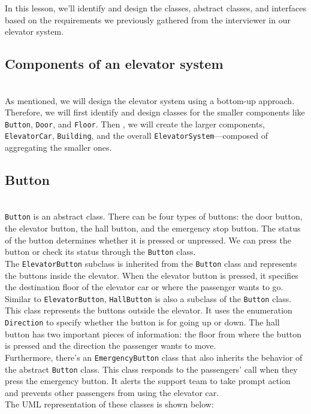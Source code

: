 

In this lesson, we'll identify and design the classes, abstract classes, and interfaces based on the requirements we previously gathered from the interviewer in our elevator system.

\subsection{Components of an elevator system}\label{7gQWTbVCc0ltN6xEKqjYE}
\\
As mentioned, we will design the elevator system using a bottom-up approach. Therefore, we will first identify and design classes for the smaller components like \texttt{Button}, \texttt{Door}, and \texttt{Floor}. Then , we will create the larger components, \texttt{ElevatorCar}, \texttt{Building}, and the overall \texttt{ElevatorSystem}---composed of aggregating the smaller ones.

\subsection{Button}\label{R94f6CUxLI2G4F-24LSWE}
\\
\texttt{Button} is an abstract class. There can be four types of buttons: the door button, the elevator button, the hall button, and the emergency stop button. The status of the button determines whether it is pressed or unpressed. We can press the button or check its status through the \texttt{Button} class.
\\
The \texttt{ElevatorButton} subclass is inherited from the \texttt{Button} class and represents the buttons inside the elevator. When the elevator button is pressed, it specifies the destination floor of the elevator car or where the passenger wants to go.
\\
Similar to \texttt{ElevatorButton}, \texttt{HallButton} is also a subclass of the \texttt{Button} class. This class represents the buttons outside the elevator. It uses the enumeration \texttt{Direction} to specify whether the button is for going up or down. The hall button has two important pieces of information: the floor from where the button is pressed and the direction the passenger wants to move.
\\
Furthermore, there's an \texttt{EmergencyButton} class that also inherits the behavior of the abstract \texttt{Button} class. This class responds to the passengers' call when they press the emergency button. It alerts the support team to take prompt action and prevents other passengers from using the elevator car.
\\
The UML representation of these classes is shown below:

